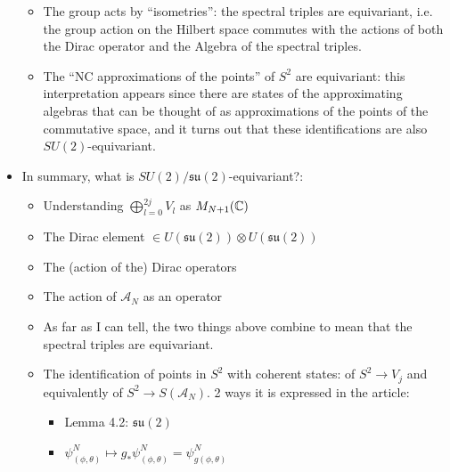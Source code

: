 \documentclass{article}
\newcommand{\sut}{\ensuremath{\mathfrak{su}(2)}}
\begin{document}
\begin{itemize}
\begin{itemize}
        \item The group acts by ``isometries'': the spectral triples are equivariant, i.e. the group action on the Hilbert space commutes with the actions of both the Dirac operator and the Algebra of the spectral triples.
        
        \item The ``NC approximations of the points'' of $S^2$ are equivariant: this interpretation appears since there are states of the approximating algebras that can be thought of as approximations of the points of the commutative space, and it turns out that these identifications are also $SU(2)$-equivariant.
        
        \end{itemize}
    
    \item In summary, what is $SU(2)/\sut$-equivariant?:
    
        \begin{itemize}
            
        \item Understanding $\bigoplus_{l = 0}^{2j} V_l$ as $M_{N+1}(\mathbb{C})$
        
        \item The Dirac element $\in U(\sut) \otimes U(\sut)$
        
        \item The (action of the) Dirac operators
        
        \item The action of $\mathcal A_N$ as an operator

        \item As far as I can tell, the two things above combine to mean that the spectral triples are equivariant.
        
        \item The identification of points in $S^2$ with coherent states: of $S^2 \to V_j$ and equivalently of $S^2 \to S(\mathcal A_N)$. 2 ways it is expressed in the article:
        
            \begin{itemize}
                
            \item Lemma 4.2: $\sut$
            
            \item $\psi^N_{(\phi, \theta)} \mapsto g_* \psi^N_{(\phi, \theta)} = \psi^N_{g(\phi, \theta)}$    
            

\end{itemize}
\end{itemize}
\end{itemize}
\end{document}
